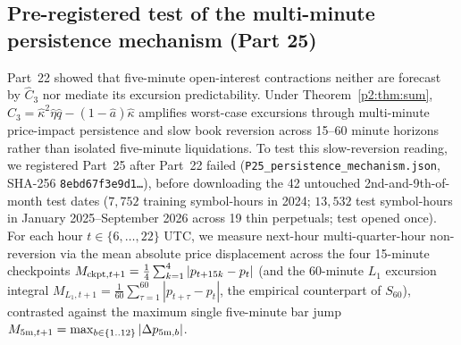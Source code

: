 \subsection{Pre-registered test of the multi-minute persistence mechanism (Part 25)}\label{p2:sec:p25}
Part~22 showed that five-minute open-interest contractions neither are forecast by $\hat C_3$ nor mediate its excursion predictability. Under Theorem~\ref{p2:thm:sum}, $\hat C_3=\hat\kappa^2\hat\eta\hat q-(1-\hat a)\hat\kappa$ amplifies worst-case excursions through multi-minute price-impact persistence and slow book reversion across 15--60 minute horizons rather than isolated five-minute liquidations. To test this slow-reversion reading, we registered Part~25 after Part~22 failed (\texttt{P25\_persistence\_mechanism.json}, SHA-256 \texttt{8ebd67f3e9d1\ldots}), before downloading the 42 untouched 2nd-and-9th-of-month test dates ($7{,}752$ training symbol-hours in 2024; $13{,}532$ test symbol-hours in January 2025--September 2026 across 19 thin perpetuals; test opened once). For each hour $t\in\{6,\dots,22\}$ UTC, we measure next-hour multi-quarter-hour non-reversion via the mean absolute price displacement across the four 15-minute checkpoints $M_{{\rm ckpt},t+1}=\frac{1}{4}\sum_{k=1}^4|p_{t+15k}-p_t|$ (and the 60-minute $L_1$ excursion integral $M_{L_1,t+1}=\frac{1}{60}\sum_{\tau=1}^{60}|p_{t+\tau}-p_t|$, the empirical counterpart of $S_{60}$), contrasted against the maximum single five-minute bar jump $M_{5{\rm m},t+1}=\max_{b\in\{1..12\}}|\Delta p_{5{\rm m},b}|$.

